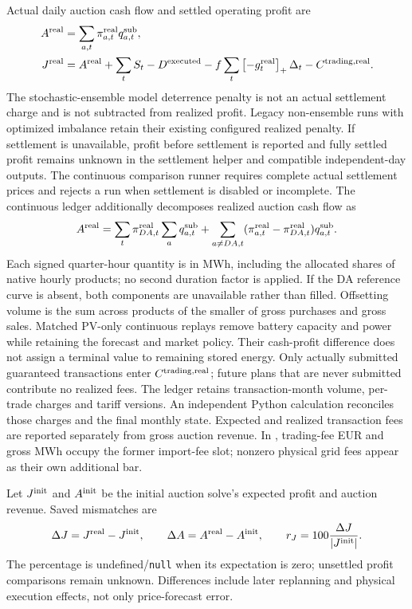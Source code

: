 \documentclass[11pt,a4paper]{article}
\newcommand{\pos}[1]{\left[#1\right]_+}
\begin{document}
Actual daily auction cash flow and settled operating profit are
\begin{align}
 A^{\rm real}&=\sum_{a,t}\pi^{\rm real}_{a,t}q^{\rm sub}_{a,t},\\
 J^{\rm real}&=A^{\rm real}+\sum_t S_t
       -D^{\rm executed}-f\sum_t\pos{-g_t^{\rm real}}\Delta_t-C^{\rm trading,real}.
\end{align}
The stochastic-ensemble model deterrence penalty is not an actual settlement
charge and is not subtracted from realized profit. Legacy non-ensemble runs
with optimized imbalance retain their existing configured realized penalty.
If settlement is unavailable,
profit before settlement is reported and fully settled profit remains unknown
in the settlement helper and compatible independent-day outputs. The continuous
comparison runner requires complete actual settlement prices and rejects a run
when settlement is disabled or incomplete.
The continuous ledger additionally decomposes realized auction cash flow as
\begin{equation}
 A^{\rm real}=\sum_t \pi^{\rm real}_{DA,t}\sum_a q^{\rm sub}_{a,t}
 +\sum_{a\ne DA,t}(\pi^{\rm real}_{a,t}-\pi^{\rm real}_{DA,t})q^{\rm sub}_{a,t}.
\end{equation}
Each signed quarter-hour quantity is in MWh, including the allocated shares
of native hourly products; no second duration factor is applied. If the DA
reference curve is absent, both components are unavailable rather than filled.
Offsetting volume is the sum across products of the smaller of gross purchases
and gross sales. Matched PV-only continuous replays remove battery capacity and
power while retaining the forecast and market policy. Their cash-profit
difference does not assign a terminal value to remaining stored energy.
Only actually submitted guaranteed transactions enter $C^{\rm trading,real}$;
future plans that are never submitted contribute no realized fees. The ledger
retains transaction-month volume, per-trade charges and tariff versions. An
independent Python calculation reconciles those charges and the final monthly
state. Expected and realized transaction fees are reported separately from gross
auction revenue. In , trading-fee EUR and
gross MWh occupy the former import-fee slot; nonzero physical grid fees appear
as their own additional bar.

Let $J^{\rm init}$ and $A^{\rm init}$ be the initial auction solve's expected
profit and auction revenue. Saved mismatches are
\begin{equation}
 \Delta J=J^{\rm real}-J^{\rm init},\qquad
 \Delta A=A^{\rm real}-A^{\rm init},\qquad
 r_J=100\frac{\Delta J}{|J^{\rm init}|}.
\end{equation}
The percentage is undefined/\texttt{null} when its expectation is zero; unsettled
profit comparisons remain unknown. Differences include later replanning and
physical execution effects, not only price-forecast error.
\end{document}
